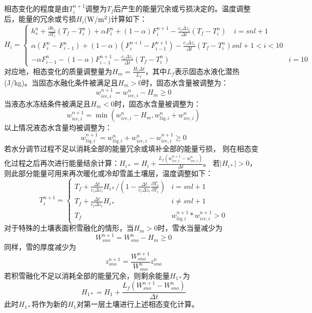 相态变化的程度是由$T_i^{n+1}$调整为$T_f$后产生的能量冗余或亏损决定的。温度调整后，能量的冗余或亏损$H_i$($\rm W/m^2$)计算如下：
\begin{equation}
H_{i}=\left\{\begin{array}{lr}h_{s}^{n}+\frac{\partial h_{s}}{\partial T_{i}}\left(T_{f}-T_{i}^{n}\right)+\alpha F_{i}^{n}+(1-\alpha) F_{i}^{n+1}-\frac{c_{i} \Delta z_{i}}{\Delta t}\left(T_{f}-T_{i}^{n}\right) \quad i=s n l+1 \\ \alpha\left(F_{i}^{n}-F_{i-1}^{n}\right)+(1-\alpha)\left(F_{i}^{n+1}-F_{i-1}^{n+1}\right)-\frac{c_{i} \Delta z_{i}}{\Delta t}\left(T_{f}-T_{i}^{n}\right) s n l+1<i<10 \\ -\alpha F_{i-1}^{n}-(1-\alpha) F_{i-1}^{n+1}-\frac{c_{i} \Delta z_{i}}{\Delta t}\left(T_{f}-T_{i}^{n}\right) & i=10\end{array}\right.
\end{equation}
对应地，相态变化的质量调整量为$H_{m}=\frac{H_{i} \Delta t}{L_{f}}$，其中$L_f$表示固态水液化潜热(J/kg)。当固态水融化条件被满足且$H_m>0$时，固态水含量被调整为：
\begin{equation}
w_{ice, i}^{n+1}=w_{ice, i}^{n}-H_{m} \geq 0
\end{equation}
当液态水冻结条件被满足且$H_m<0$时，固态水含量被调整为：
\begin{equation}
w_{ice, i}^{n+1}=\min \left(w_{ice, i}^{n}-H_{m}, w_{liq, i}^{n}+w_{ice, i}^{n}\right)
\end{equation}
以上情况液态水含量均被调整为：
\begin{equation}
w_{liq, i}^{n+1}=w_{liq, i}^{n}+w_{ice, i}^{n}-w_{ice, i}^{n+1} \geq 0
\end{equation}
若水分调节过程不足以消耗全部的能量冗余或填补全部的能量亏损，
则在相态变化过程之后再次进行能量结余计算：$ H_{i *}=H_{i}+\frac{L_{f}\left(w_{ice, i}^{n+1}-w_{ice, i}^{n}\right)}{\Delta t}$。
若$\left|H_{i\ast}\right|>0$，则此部分能量可用来再次暖化或冷却雪盖土壤层，温度调整如下：
\begin{equation}
T_{i}^{n+1}=\left\{\begin{array}{lr}T_{f}+\frac{\Delta t}{c_{i} \Delta z_{i}} H_{i *} /\left(1-\frac{\Delta t}{c_{i} \Delta z_{i}} \frac{\partial T_{s}}{\partial T_{i}}\right) & i=s n l+1 \\ T_{f}+\frac{\Delta t}{c_{i} \Delta z_{i}} H_{i *} & i \neq s n l+1 \\ T_{f} & w_{liq, i}^{n+1} * w_{ice, i}^{n+1}>0\end{array}\right.
\end{equation}
对于特殊的土壤表面积雪融化的情形，当$H_m>0$时，雪水当量减少为
\begin{equation}
W_{sno}^{n+1}=W_{s no}^{n}-H_{m} \geq 0
\end{equation}
同样，雪的厚度减少为
\begin{equation}
z_{sno}^{n+1}=\frac{W_{sno}^{n+1}}{W_{sno}^{n}} z_{sno}^{n}
\end{equation}
若积雪融化不足以消耗全部的能量冗余，则剩余能量$H_{1\ast}$为
\begin{equation}
H_{1 *}=H_{1}+\frac{L_{f}\left(W_{sno}^{n+1}-W_{sno}^{n}\right)}{\Delta t}
\end{equation}
此时$H_{1\ast}$将作为新的$H_1$对第一层土壤进行上述相态变化计算。


